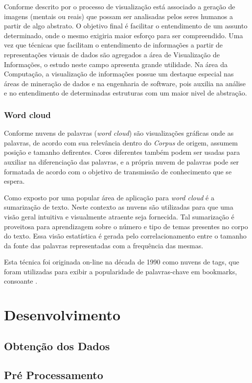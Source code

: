 \documentclass[
	12pt,				%
	openright,			%
	twoside,			%
	a4paper,			%
	english,			%
	french,				%
	spanish,			%
	brazil				%
	]{abntex2}
\begin{document}
Conforme descrito por  o processo de visualização está associado a geração de imagens (mentais ou reais) que possam ser analisadas pelos seres humanos a partir de algo abstrato. O objetivo final é facilitar o entendimento de um assunto determinado, onde o mesmo exigiria maior esforço para ser compreendido. Uma vez que técnicas que facilitam o entendimento de informações a partir de representações visuais de dados são agregados a área de Visualização de Informações, o estudo neste campo apresenta grande utilidade. Na área da Computação, a visualização de informações possue um destaque especial nas áreas de mineração de dados e na engenharia de software, pois auxilia na análise e no entendimento de determinadas estruturas com um maior nivel de abstração.
\subsection{Word cloud}
Conforme  nuvens de palavras (\emph{word cloud}) são visualizações gráficas onde as palavras, de acordo com sua relevância dentro do \emph{Corpus} de origem, assumem posição e tamanho defirentes. Cores diferentes também podem ser usadas para auxiliar na diferenciação das palavras, e a própria nuvem de palavras pode ser formatada de acordo com o objetivo de transmissão de conhecimento que se espera.

Como exposto por  uma popular área de aplicação para \emph{word cloud} é a sumarização de texto. Neste contexto as nuvens são utilizadas para que uma visão geral intuitiva e visualmente atraente seja fornecida. Tal sumarização é proveitosa para aprendizagem sobre o número e tipo de temas presentes no corpo do texto. Essa visão estatística é gerada pelo correlacionamento entre o tamanho da fonte das palavras representadas com a frequência das mesmas. 

Esta técnica foi originada on-line na década de 1990 como nuvens de tags, que foram utilizadas para exibir a popularidade de palavras-chave em bookmarks, consoante .
\chapter{Desenvolvimento}
\section{Obtenção dos Dados}
\section{Pré Processamento}
\end{document}
